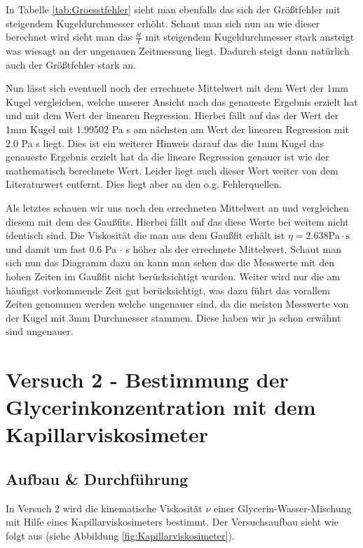            In Tabelle \ref{tab:Groesstfehler} sieht man ebenfalls das sich der Größtfehler mit steigendem Kugeldurchmesser erhöht. Schaut man sich nun an wie dieser berechnet wird sieht man das $\frac{\delta t}{t}$ mit steigendem Kugeldurchmesser stark ansteigt was wiesagt an der ungenauen Zeitmessung liegt. Dadurch steigt dann natürlich auch der Größtfehler stark an. 

            Nun lässt sich eventuell noch der errechnete Mittelwert mit dem Wert der 1mm Kugel vergleichen, welche unserer Ansicht nach das genaueste Ergebnis erzielt hat und mit dem Wert der linearen Regression. Hierbei fällt auf das der Wert der 1mm Kugel mit 1.99502 Pa s am nächsten am Wert der linearen Regression mit 2.0 Pa s liegt. Dies ist ein weiterer Hinweis darauf das die 1mm Kugel das genaueste Ergebnis erzielt hat da die lineare Regression genauer ist wie der mathematisch berechnete Wert. Leider liegt auch dieser Wert weiter von dem Literaturwert entfernt. Dies liegt aber an den o.g. Fehlerquellen.

            Als letztes schauen wir uns noch den errechneten Mittelwert an und vergleichen diesem mit dem des Gaußfits. Hierbei fällt auf das diese Werte bei weitem nicht identisch sind. Die Viskosität die man aus dem Gaußfit erhält ist $\eta = 2.638 \mathrm{Pa \cdot s}$ und damit um fast 0.6 Pa $\cdot$ s höher als der errechnete Mittelwert. Schaut man sich nun das Diagramm dazu an kann man sehen das die Messwerte mit den hohen Zeiten im Gaußfit nicht berücksichtigt wurden. Weiter wird nur die am häufigst vorkommende Zeit gut berücksichtigt, was dazu führt das vorallem Zeiten genommen werden welche ungenauer sind, da die meisten Messwerte von der Kugel mit 3mm Durchmesser stammen. Diese haben wir ja schon erwähnt sind ungenauer. 
        
    \section{Versuch 2 - Bestimmung der Glycerinkonzentration mit dem Kapillarviskosimeter}
    \label{sec:Versuch2}

        \subsection{Aufbau \& Durchführung}
            
            In Versuch 2 wird die kinematische Viskosität $\nu$ einer Glycerin-Wasser-Mischung mit Hilfe eines Kapillarviskosimeters bestimmt. Der Versuchsaufbau sieht wie folgt aus (siehe Abbildung \ref{fig:Kapillarviskosimeter}).

